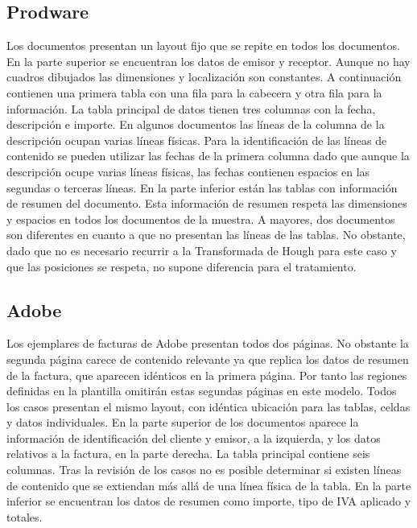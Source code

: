 \subsection{Prodware}

Los documentos presentan un layout fijo que se repite en todos los documentos. En la parte superior se encuentran los datos de emisor y receptor. Aunque no hay cuadros dibujados las dimensiones y localización son constantes. A continuación contienen una primera tabla con una fila para la cabecera y otra fila para la información. La tabla principal de datos tienen tres columnas con la fecha, descripción e importe. En algunos documentos las líneas de la columna de la descripción ocupan varias líneas físicas. Para la identificación de las líneas de contenido se pueden utilizar las fechas de la primera columna dado que aunque la descripción ocupe varias líneas físicas, las fechas contienen espacios en las segundas o terceras líneas. En la parte inferior están las tablas con información de resumen del documento. Esta información de resumen respeta las dimensiones y espacios en todos los documentos de la muestra. A mayores, dos documentos son diferentes en cuanto a que no presentan las líneas de las tablas. No obstante, dado que no es necesario recurrir a la Transformada de Hough para este caso y que las posiciones se respeta, no supone diferencia para el tratamiento.
 
\subsection{Adobe}

Los ejemplares de facturas de Adobe presentan todos dos páginas. No obstante la segunda página carece de contenido relevante ya que replica los datos de resumen de la factura, que aparecen idénticos en la primera página. Por tanto las regiones definidas en la plantilla omitirán estas segundas páginas en este modelo.
Todos los casos presentan el mismo layout, con idéntica ubicación para las tablas, celdas y datos individuales. En la parte superior de los documentos aparece la información de identificación del cliente y emisor, a la izquierda, y los datos relativos a la factura, en la parte derecha.
La tabla principal contiene seis columnas. Tras la revisión de los casos no es posible determinar si existen líneas de contenido que se extiendan más allá de una línea física de la tabla.
En la parte inferior se encuentran los datos de resumen como importe, tipo de IVA aplicado y totales.

